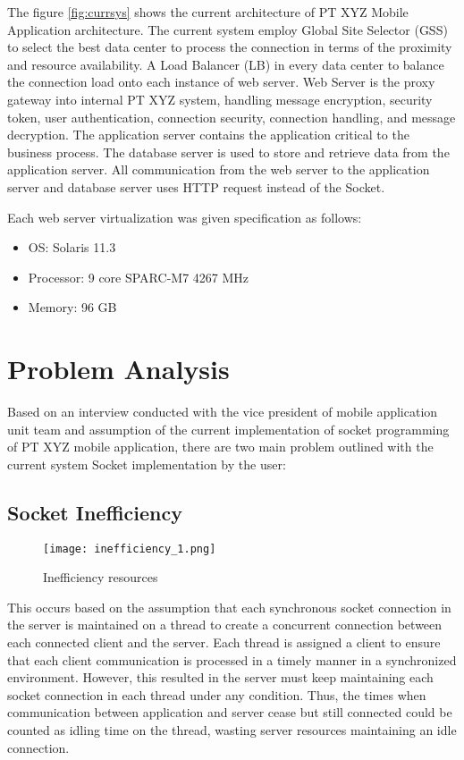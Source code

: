 The figure \ref{fig:currsys} shows the current architecture of PT XYZ Mobile Application architecture. The current system employ Global Site Selector (GSS) to select the best data center to process the connection in terms of the proximity and resource availability. A Load Balancer (LB) in every data center to balance the connection load onto each instance of web server. Web Server is the proxy gateway into internal PT XYZ system, handling message encryption, security token, user authentication, connection security, connection handling, and message decryption.
The application server contains the application critical to the business process. The database server is used to store and retrieve data from the application server. All communication from the web server to the application server and database server uses HTTP request instead of the Socket.

Each web server virtualization was given specification as follows:
\begin{itemize}
\itemsep0em
\item OS: Solaris 11.3
\item Processor: 9 core \@ SPARC-M7 4267 MHz
\item Memory: 96 GB
\end{itemize}


\section{Problem Analysis}
Based on an interview conducted with the vice president of mobile application unit team and assumption of the current implementation of socket programming of PT XYZ mobile application, there are two main problem outlined with the current system Socket implementation by the user:

\subsection{Socket Inefficiency}

\begin{figure}[h]
\centering
\texttt{[image: inefficiency\_1.png]}
\caption{Inefficiency resources}
\label{fig:inefficiency}
\end{figure}
This occurs based on the assumption that each synchronous socket connection in the server is maintained on a thread to create a concurrent connection between each connected client and the server. Each thread is assigned a client to ensure that each client communication is processed in a timely manner in a synchronized environment.
However, this resulted in the server must keep maintaining each socket connection in each thread under any condition. Thus, the times when communication between application and server cease but still connected could be counted as idling time on the thread, wasting server resources maintaining an idle connection.

